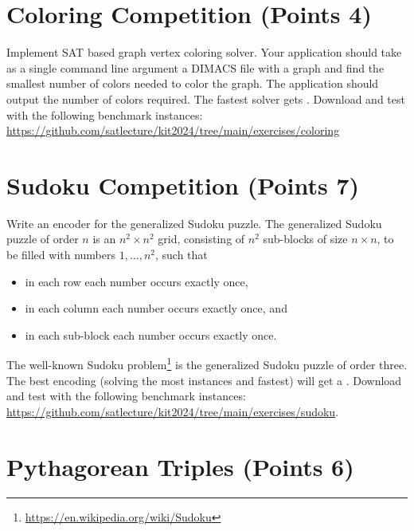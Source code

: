 \documentclass{article}
\begin{document}

\section{Coloring Competition (Points 4)}

Implement SAT based graph vertex coloring solver.
Your application should take as a single command line argument a DIMACS file with a graph and find the smallest number of colors needed to color the graph.
The application should output the number of colors required.
The fastest solver gets .
Download and test with the following benchmark instances: \url{https://github.com/satlecture/kit2024/tree/main/exercises/coloring}

\section{Sudoku Competition (Points 7)}

Write an encoder for the generalized Sudoku puzzle.
The generalized Sudoku puzzle of order $n$ is an $n^2 \times n^2$ grid, consisting of $n^2$ sub-blocks of size $n \times n$, to be filled with numbers $1, \dots, n^2$, such that
\begin{itemize}\setlength{\itemsep}{0pt}
\item in each row each number occurs exactly once,
\item in each column each number occurs exactly once, and
\item in each sub-block each number occurs exactly once.
\end{itemize}
The well-known Sudoku problem\footnote{\url{https://en.wikipedia.org/wiki/Sudoku}} is the generalized Sudoku puzzle of order three.
The best encoding (solving the most instances and fastest) will get a .
Download and test with the following benchmark instances: \url{https://github.com/satlecture/kit2024/tree/main/exercises/sudoku}.


\section{Pythagorean Triples (Points 6)}
\end{document}
